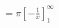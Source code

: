 \documentclass[preview]{standalone}
\begin{document}
\begin{align*}
= \pi \left[ -\frac{1}{x} \right]_1^{\infty}
\end{align*}
\end{document}
